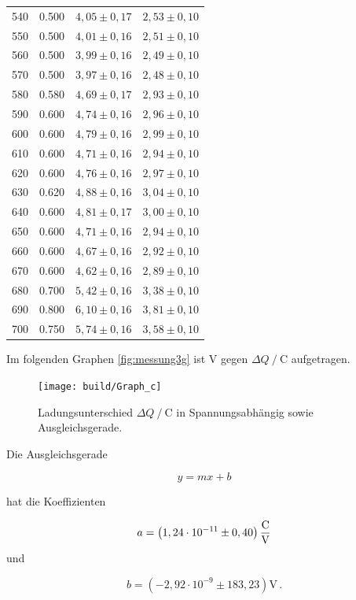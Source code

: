 \begin{table}[H]
\begin{tabular}{S[table-format=3.0] S[table-format=1.3] S  S}
      540  &  0.500 &  {$4,05 \pm 0,17$} &  {$2,53 \pm 0,10$}       \\
      550  &  0.500 &  {$4,01 \pm 0,16$} &  {$2,51 \pm 0,10$}       \\
      560  &  0.500 &  {$3,99 \pm 0,16$} &  {$2,49 \pm 0,10$}       \\
      570  &  0.500 &  {$3,97 \pm 0,16$} &  {$2,48 \pm 0,10$}       \\
      580  &  0.580 &  {$4,69 \pm 0,17$} &  {$2,93 \pm 0,10$}       \\
      590  &  0.600 &  {$4,74 \pm 0,16$} &  {$2,96 \pm 0,10$}       \\
      600  &  0.600 &  {$4,79 \pm 0,16$} &  {$2,99 \pm 0,10$}       \\
      610  &  0.600 &  {$4,71 \pm 0,16$} &  {$2,94 \pm 0,10$}       \\
      620  &  0.600 &  {$4,76 \pm 0,16$} &  {$2,97 \pm 0,10$}       \\
      630  &  0.620 &  {$4,88 \pm 0,16$} &  {$3,04 \pm 0,10$}       \\
      640  &  0.600 &  {$4,81 \pm 0,17$} &  {$3,00 \pm 0,10$}       \\
      650  &  0.600 &  {$4,71 \pm 0,16$} &  {$2,94 \pm 0,10$}       \\
      660  &  0.600 &  {$4,67 \pm 0,16$} &  {$2,92 \pm 0,10$}       \\
      670  &  0.600 &  {$4,62 \pm 0,16$} &  {$2,89 \pm 0,10$}       \\
      680  &  0.700 &  {$5,42 \pm 0,16$} &  {$3,38 \pm 0,10$}       \\
      690  &  0.800 &  {$6,10 \pm 0,16$} &  {$3,81 \pm 0,10$}       \\
      700  &  0.750 &  {$5,74 \pm 0,16$} &  {$3,58 \pm 0,10$}       \\ 
    \bottomrule
    \end{tabular}
\end{table}

Im folgenden Graphen \autoref{fig:messung3g} ist $ \unit{\volt}$ gegen $\Delta Q \mathbin{/} \unit{\coulomb}$ aufgetragen.
\begin{figure}[H]
  \centering
  \texttt{[image: build/Graph\_c]}
  \caption{Ladungsunterschied $\Delta Q \mathbin{/} \unit{\coulomb}$ in Spannungsabhängig sowie Ausgleichsgerade.}
  \label{fig:messung3g}
\end{figure}

Die Ausgleichsgerade 

\begin{equation*}
   y = m x + b
\end{equation*}

hat die Koeffizienten

\begin{equation*}
  a = \left( 1,24 \cdot 10^{-11} \pm 0,40 \right) \unit{\dfrac{\coulomb}{\volt}}
\end{equation*}
und

\begin{equation*}
  b = \left( -2,92 \cdot 10^{-9} \pm 183,23 \right) \unit{\volt \, .}
\end{equation*}
